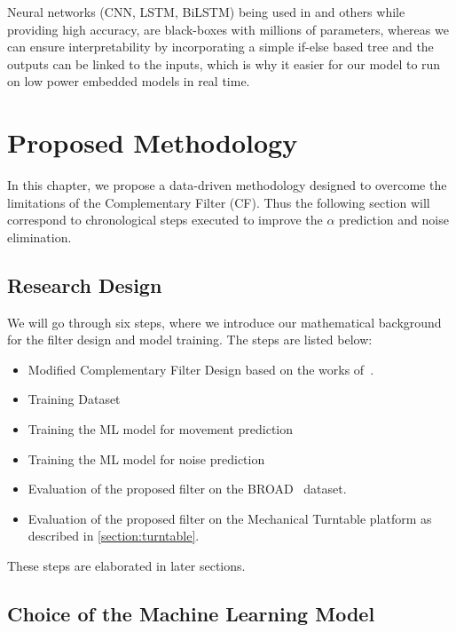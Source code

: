 \documentclass{iutbscthesis}
\begin{document}
Neural networks (CNN, LSTM, BiLSTM) being used in \cite{golroudbari2023cnn6DOF} and others while providing high accuracy, are black-boxes with millions of parameters, whereas we can ensure interpretability by incorporating a simple if-else based tree and the outputs can be linked to the inputs, which is why it easier for our model to run on low power embedded models in real time. 



\chapter{Proposed Methodology}\label{chapter:proposed}
In this chapter, we propose a data-driven methodology designed to overcome the limitations of the Complementary Filter (CF). Thus the following section will correspond to chronological steps executed to improve the $\alpha$ prediction and noise elimination.

\section{Research Design}
We will go through six steps, where we introduce our mathematical background for the filter design and model training. The steps are listed below:
\begin{itemize}
    \item Modified Complementary Filter Design based on the works of~\cite{vertzberger2022adaptive}.
    \item Training Dataset
    \item Training the ML model for movement prediction
    \item Training the ML model for noise prediction
    \item Evaluation of the proposed filter on the BROAD~\cite{BROAD} dataset.
    \item Evaluation of the proposed filter on the Mechanical Turntable platform as described in \autoref{section:turntable}.
\end{itemize}

These steps are elaborated in later sections.

\section{Choice of the Machine Learning Model}
\end{document}
